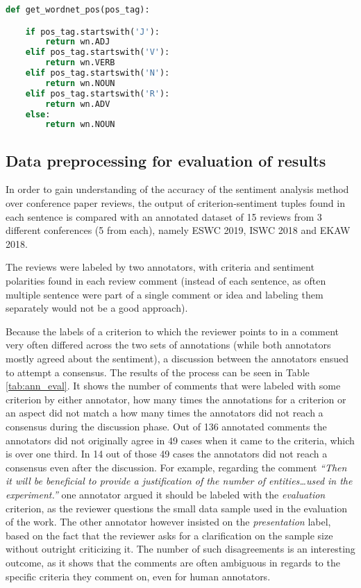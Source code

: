 \begin{lstlisting}[caption=Transformation between Treebank and WordNet POS tag sets,
  language=python, label={img:tb_wn},
  xleftmargin=.2\textwidth, xrightmargin=.2\textwidth]
def get_wordnet_pos(pos_tag):

    if pos_tag.startswith('J'):
        return wn.ADJ
    elif pos_tag.startswith('V'):
        return wn.VERB
    elif pos_tag.startswith('N'):
        return wn.NOUN
    elif pos_tag.startswith('R'):
        return wn.ADV
    else:
        return wn.NOUN
\end{lstlisting}



\subsection{Data preprocessing for evaluation of results}
\label{sec:preprocessing_eval}
In order to gain understanding of the accuracy of the sentiment analysis method over conference paper reviews, the output of criterion-sentiment tuples found in each sentence is compared with an annotated dataset of 15 reviews from 3 different conferences (5 from each), namely ESWC 2019, ISWC 2018 and EKAW 2018. 

The reviews were labeled by two annotators, with criteria and sentiment polarities found in each review comment (instead of each sentence, as often multiple sentence were part of a single comment or idea and labeling them separately would not be a good approach).

Because the labels of a criterion to which the reviewer points to in a comment very often differed across the two sets of annotations (while both annotators mostly agreed about the sentiment), a discussion between the annotators ensued to attempt a consensus. The results of the process can be seen in Table \ref{tab:ann_eval}. It shows the number of comments that were labeled with some criterion by either annotator, how many times the annotations  for a criterion or an aspect did not match a how many times the annotators did not reach a consensus during the discussion phase. Out of 136 annotated comments the annotators did not originally agree in 49 cases when it came to the criteria, which is over one third. In 14 out of those 49 cases the annotators did not reach a consensus even after the discussion. For example, regarding the comment \textit{``Then it will be beneficial to provide a justification of the number of entities\ldots used in the experiment.''} one annotator argued it should be labeled with the \textit{evaluation} criterion, as the reviewer questions the small data sample used in the evaluation of the work. The other annotator however insisted on the \textit{presentation} label, based on the fact that the reviewer asks for a clarification on the sample size without outright criticizing it.  The number of such disagreements is an interesting outcome, as it shows that the comments are often ambiguous in regards to the specific criteria they comment on, even for human annotators. 


